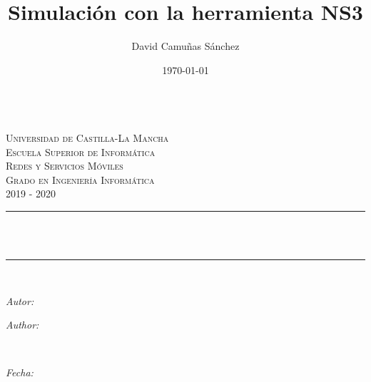 \documentclass[11pt]{article}
\title{Simulación con la herramienta NS3}							%
\author{David Camuñas Sánchez}							%
\date{\today}											%
\makeatletter
\newif\ifspanish %
\newif\ifmultipleauthors %
\newcommand{\subject}{Redes y Servicios Móviles}						%
\newcommand{\course}{Grado en Ingeniería Informática}	%
\newcommand{\courseyear}{2019 - 2020} 					%
\newcommand{\dateText}{Fecha:}
\newcommand{\dateText}{Date:}
\let\thetitle\@title
\let\theauthor\@author
\let\thedate\@date
\makeatother
\begin{document}

\begin{titlepage}
	\centering
	\begin{minipage}[t]{\textwidth}
		\hspace{\fill}
	\end{minipage}
	\\[2.25 cm]
    \textsc{\LARGE Universidad de Castilla-La Mancha}\\[1 cm]	%
    \textsc{\LARGE Escuela Superior de Informática}\\[2.0 cm]
	\textsc{\Large \subject}\\[0.5 cm]				%
	\textsc{\large \course \\ \courseyear}\\[2 cm]				%
	\rule{\linewidth}{0.2 mm} \\[0.4 cm]
	{ \huge \bfseries \thetitle}\\
	\rule{\linewidth}{0.2 mm} \\[2.5 cm]

	\vspace*{\fill}
	\begin{minipage}{0.4\textwidth}
		\begin{flushleft} \large
			\ifspanish
				\ifmultipleauthors
					\emph{Autores:}\\
				\else
					\emph{Autor:}\\
				\fi
			\else
				\ifmultipleauthors
					\emph{Authors:}\\
				\else
					\emph{Author:}\\
				\fi
			\fi
			\theauthor
			\end{flushleft}
			\end{minipage}~
			\begin{minipage}{0.4\textwidth}
			\begin{flushright} \large
			\emph{\dateText} \\
			\thedate
		\end{flushright}
	\end{minipage}\\[2.25 cm]


\end{titlepage}
\end{document}
